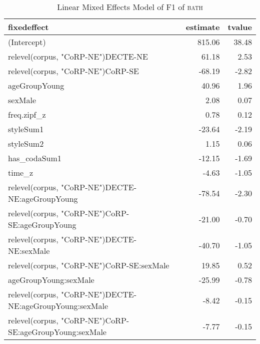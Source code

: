 \begin{table}[ht]
\centering
\begin{tabular}{lrr}
  \hline
fixedeffect & estimate & tvalue \\ 
  \hline
(Intercept) & 815.06 & 38.48 \\ 
  relevel(corpus, "CoRP-NE")DECTE-NE & 61.18 & 2.53 \\ 
  relevel(corpus, "CoRP-NE")CoRP-SE & -68.19 & -2.82 \\ 
  ageGroupYoung & 40.96 & 1.96 \\ 
  sexMale & 2.08 & 0.07 \\ 
  freq.zipf\_z & 0.78 & 0.12 \\ 
  styleSum1 & -23.64 & -2.19 \\ 
  styleSum2 & 1.15 & 0.06 \\ 
  has\_codaSum1 & -12.15 & -1.69 \\ 
  time\_z & -4.63 & -1.05 \\ 
  relevel(corpus, "CoRP-NE")DECTE-NE:ageGroupYoung & -78.54 & -2.30 \\ 
  relevel(corpus, "CoRP-NE")CoRP-SE:ageGroupYoung & -21.00 & -0.70 \\ 
  relevel(corpus, "CoRP-NE")DECTE-NE:sexMale & -40.70 & -1.05 \\ 
  relevel(corpus, "CoRP-NE")CoRP-SE:sexMale & 19.85 & 0.52 \\ 
  ageGroupYoung:sexMale & -25.99 & -0.78 \\ 
  relevel(corpus, "CoRP-NE")DECTE-NE:ageGroupYoung:sexMale & -8.42 & -0.15 \\ 
  relevel(corpus, "CoRP-NE")CoRP-SE:ageGroupYoung:sexMale & -7.77 & -0.15 \\ 
   \hline
\end{tabular}
\caption{Linear Mixed Effects Model of F1 of \textsc{bath} \label{tbl:BF1}} 
\end{table}
